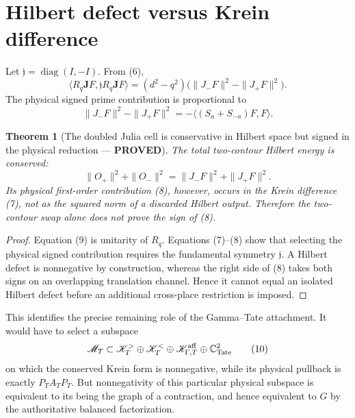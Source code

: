 \documentclass[11pt]{article}
\newcommand{\PROVED}{\textcolor{green!40!black}{\textbf{PROVED}}}
\newtheorem{theorem}{Theorem}
\begin{document}
\section{Hilbert defect versus Krein difference}

Let $\mathfrak j=\operatorname{diag}(I,-I)$.  From (6),
\begin{equation}
 \langle R_q\mathbf JF,\mathfrak jR_q\mathbf JF\rangle
 =(d^2-q^2)
   \bigl(\|J_-F\|^2-\|J_+F\|^2\bigr).                        \tag{7}
\end{equation}
The physical signed prime contribution is proportional to
\begin{equation}
 \|J_-F\|^2-\|J_+F\|^2
 =-\langle(S_a+S_{-a})F,F\rangle.                             \tag{8}
\end{equation}

\begin{theorem}[The doubled Julia cell is conservative in Hilbert space
but signed in the physical reduction --- \PROVED]
The total two-contour Hilbert energy is conserved:
\begin{equation}
                         \|O_+\|^2+\|O_-\|^2
 =\|J_-F\|^2+\|J_+F\|^2.                                    \tag{9}
\end{equation}
Its physical first-order contribution (8), however, occurs in the Krein
difference (7), not as the squared norm of a discarded Hilbert output.
Therefore the two-contour swap alone does not prove the sign of (8).
\end{theorem}

\begin{proof}
Equation (9) is unitarity of $R_q$.  Equations (7)--(8) show that selecting
the physical signed contribution requires the fundamental symmetry
$\mathfrak j$.  A Hilbert defect is nonnegative by construction, whereas
the right side of (8) takes both signs on an overlapping translation
channel.  Hence it cannot equal an isolated Hilbert defect before an
additional cross-place restriction is imposed.
\end{proof}

This identifies the precise remaining role of the Gamma--Tate attachment.
It would have to select a subspace
\begin{equation}
 \mathscr M_T\subset
 \mathscr K_T^>\oplus\mathscr K_T^<\oplus
 \mathscr K_{\Gamma,T}^{\rm aff}\oplus\mathbb C^2_{\rm Tate}              \tag{10}
\end{equation}
on which the conserved Krein form is nonnegative, while its physical
pullback is exactly $P_TA_TP_T$.  But nonnegativity of this particular
physical subspace is equivalent to its being the graph of a contraction,
and hence equivalent to $G$ by the authoritative balanced factorization.
\end{document}
